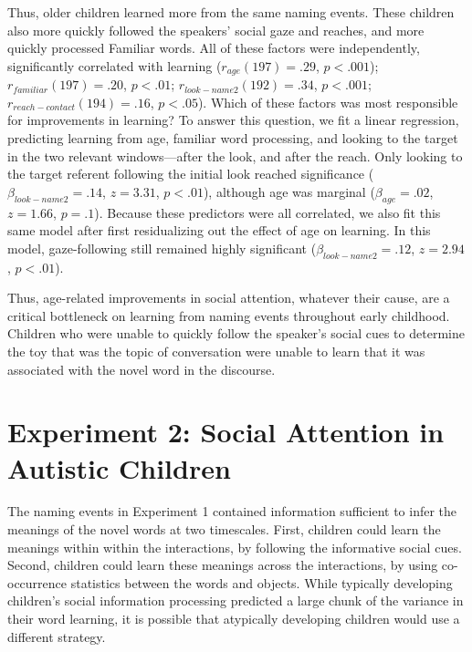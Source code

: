 \documentclass{pnastwo}
\begin{document}
\begin{article}
Thus, older children learned more from the same naming events. These children also more quickly followed the speakers' social gaze and reaches, and more quickly processed Familiar words. All of these factors were independently, significantly correlated with learning ($r_{age}(197) = .29$, $p < .001$); $r_{familiar}(197) = .20$, $p < .01$; $r_{look-name2}(192) = .34$, $p < .001$; $r_{reach-contact}(194) = .16$, $p < .05$). Which of these factors was most responsible for improvements in learning? To answer this question, we fit a linear regression, predicting learning from age, familiar word processing, and looking to the target in the two relevant windows---after the look, and after the reach. Only looking to the target referent following the initial look reached significance ($\beta_{look-name2} = .14$, $z = 3.31$, $p < .01$), although age was marginal ($\beta_{age} = .02$, $z = 1.66$, $p = .1$). Because these predictors were all correlated, we also fit this same model after first residualizing out the effect of age on learning. In this model, gaze-following still remained highly significant ($\beta_{look-name2} = .12$, $z = 2.94$, $p < .01$).

Thus, age-related improvements in social attention, whatever their cause, are a critical bottleneck on learning from naming events throughout early childhood. Children who were unable to quickly follow the speaker's social cues to determine the toy that was the topic of conversation were unable to learn that it was associated with the novel word in the discourse.

\section{Experiment 2: Social Attention in Autistic Children}

The naming events in Experiment 1 contained information sufficient to infer the meanings of the novel words at two timescales. First, children could learn the meanings within within the interactions, by following the informative social cues. Second, children could learn these meanings  across the interactions, by using co-occurrence statistics between the words and objects. While typically developing children's social information processing predicted a large chunk of the variance in their word learning, it is possible that atypically developing children would use a different strategy.


\end{article}
\end{document}
